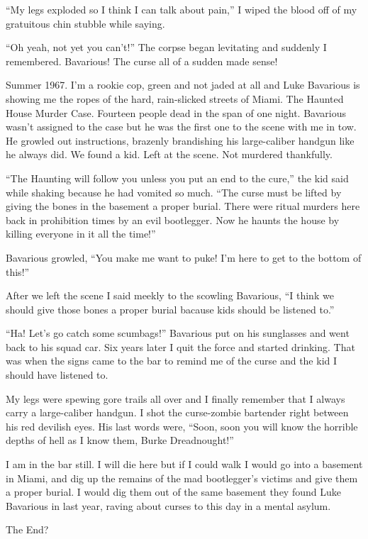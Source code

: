 ``My legs exploded so I think I can talk about pain,'' I wiped the
blood off of my gratuitous chin stubble while saying.



``Oh yeah, not yet you can't!'' The corpse began levitating and
suddenly I remembered. Bavarious! The curse all of a sudden made
sense!



Summer 1967. I'm a rookie cop, green and not jaded at all and Luke
Bavarious is showing me the ropes of the hard, rain-slicked streets
of Miami. The Haunted House Murder Case. Fourteen people dead in
the span of one night. Bavarious wasn't assigned to the case but he
was the first one to the scene with me in tow. He growled out
instructions, brazenly brandishing his large-caliber handgun like
he always did. We found a kid. Left at the scene. Not murdered
thankfully.



``The Haunting will follow you unless you put an end to the cure,''
the kid said while shaking because he had vomited so much. ``The
curse must be lifted by giving the bones in the basement a proper
burial. There were ritual murders here back in prohibition times by
an evil bootlegger. Now he haunts the house by killing everyone in
it all the time!''



Bavarious growled, ``You make me want to puke! I'm here to get to
the bottom of this!''



After we left the scene I said meekly to the scowling Bavarious, ``I
think we should give those bones a proper burial bacause kids
should be listened to.''



``Ha! Let's go catch some scumbags!'' Bavarious put on his sunglasses
and went back to his squad car. Six years later I quit the force
and started drinking. That was when the signs came to the bar to
remind me of the curse and the kid I should have listened to.



My legs were spewing gore trails all over and I finally remember
that I always carry a large-caliber handgun. I shot the
curse-zombie bartender right between his red devilish eyes. His
last words were, ``Soon, soon you will know the horrible depths of
hell as I know them, Burke Dreadnought!''



I am in the bar still. I will die here but if I could walk I would
go into a basement in Miami, and dig up the remains of the mad
bootlegger's victims and give them a proper burial. I would dig
them out of the same basement they found Luke Bavarious in last
year, raving about curses to this day in a mental asylum.



The End?



 



